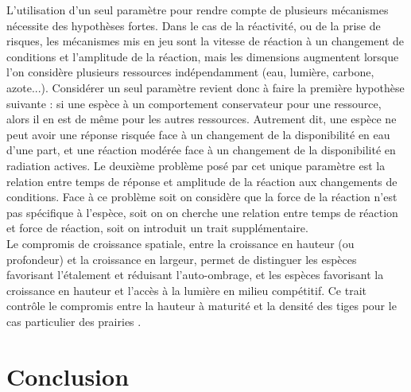 \documentclass[french]{article}
\begin{document}
{\indent L'utilisation d'un seul paramètre pour rendre compte de plusieurs mécanismes nécessite des hypothèses fortes. Dans le cas de la réactivité, ou de la prise de risques, les mécanismes mis en jeu sont la vitesse de réaction à un changement de conditions et l'amplitude de la réaction, mais les dimensions augmentent lorsque l'on considère plusieurs ressources indépendamment (eau, lumière, carbone, azote...). Considérer un seul paramètre revient donc à faire la première hypothèse suivante : si une espèce à un comportement conservateur pour une ressource, alors il en est de même pour les autres ressources. Autrement dit, une espèce ne peut avoir une réponse risquée face à un changement de la disponibilité en eau d'une part, et une réaction modérée face à un changement de la disponibilité en radiation actives. Le deuxième problème posé par cet unique paramètre est la relation entre temps de réponse et amplitude de la réaction aux changements de conditions. Face à ce problème soit on considère que la force de la réaction n'est pas spécifique à l'espèce, soit on on cherche une relation entre temps de réaction et force de réaction, soit on introduit un trait supplémentaire.\\

\indent Le compromis de croissance spatiale, entre la croissance en hauteur (ou profondeur) et la croissance en largeur, permet de distinguer les espèces favorisant l'étalement et réduisant l'auto-ombrage, et les espèces favorisant la croissance en hauteur et l'accès à la lumière en milieu compétitif. Ce trait contrôle le compromis entre la hauteur à maturité et la densité des tiges pour le cas particulier des prairies \cite{Maire2013}.


\section{Conclusion}


%  

}
\end{document}
